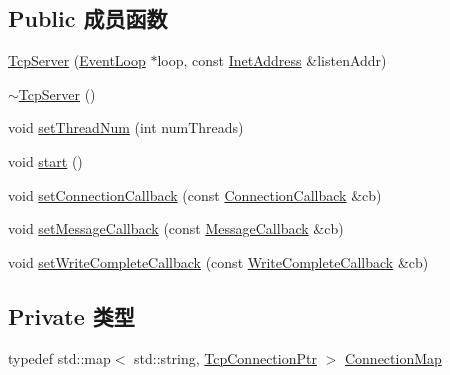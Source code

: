 \subsection*{Public 成员函数}
\begin{DoxyCompactItemize}
\item 
\hyperlink{classmuduo_1_1TcpServer_aca9a1702da801c3275b2e70d233cc0c7}{Tcp\+Server} (\hyperlink{classmuduo_1_1EventLoop}{Event\+Loop} $\ast$loop, const \hyperlink{classmuduo_1_1InetAddress}{Inet\+Address} \&listen\+Addr)
\item 
\hyperlink{classmuduo_1_1TcpServer_a4eb415b51f7d85a5d4ac91370d0cbb00}{$\sim$\+Tcp\+Server} ()
\item 
void \hyperlink{classmuduo_1_1TcpServer_a83bb28d139df96ba9fc449b4643f2c36}{set\+Thread\+Num} (int num\+Threads)
\item 
void \hyperlink{classmuduo_1_1TcpServer_a60de64d75454385b23995437f1d72669}{start} ()
\item 
void \hyperlink{classmuduo_1_1TcpServer_abbb0008856a8495adb08c8cb7fe65c2c}{set\+Connection\+Callback} (const \hyperlink{namespacemuduo_ac7f7b0c9c9e96123dfea3fe120a2c404}{Connection\+Callback} \&cb)
\item 
void \hyperlink{classmuduo_1_1TcpServer_a0a67f11f92b4cdc6f6c66b861f81cb08}{set\+Message\+Callback} (const \hyperlink{namespacemuduo_ab8a96fa483cffe150618e01058e6fc1b}{Message\+Callback} \&cb)
\item 
void \hyperlink{classmuduo_1_1TcpServer_a94b31be320453fc8aeae81b25934b43f}{set\+Write\+Complete\+Callback} (const \hyperlink{namespacemuduo_a605eda27d048a69607942b95735d7087}{Write\+Complete\+Callback} \&cb)
\end{DoxyCompactItemize}
\subsection*{Private 类型}
\begin{DoxyCompactItemize}
\item 
typedef std\+::map$<$ std\+::string, \hyperlink{namespacemuduo_a40c45128e9700d337d92f3cbb8dd4a0a}{Tcp\+Connection\+Ptr} $>$ \hyperlink{classmuduo_1_1TcpServer_a757ed86be3708eee03ff754c5108abdd}{Connection\+Map}
\end{DoxyCompactItemize}
